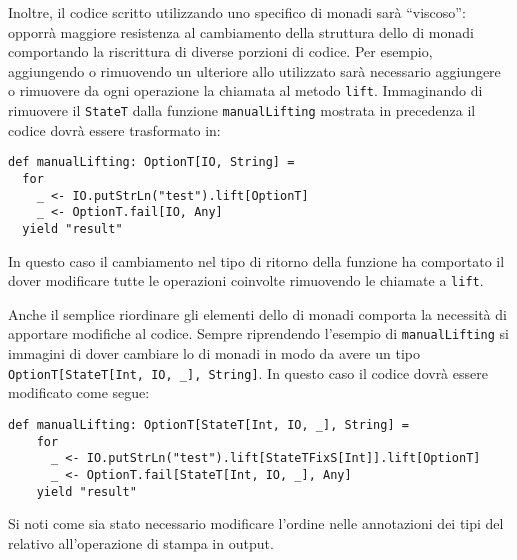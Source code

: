 Inoltre, il codice scritto utilizzando uno specifico  di monadi sarà ``viscoso'': opporrà maggiore resistenza al cambiamento della struttura dello  di monadi comportando la riscrittura di diverse porzioni di codice. Per esempio, aggiungendo o rimuovendo un ulteriore  allo  utilizzato sarà necessario aggiungere o rimuovere da ogni operazione la chiamata al metodo \lstinline{lift}. Immaginando di rimuovere il  \lstinline{StateT} dalla funzione \lstinline{manualLifting} mostrata in precedenza il codice dovrà essere trasformato in:
\begin{lstlisting}[language=scala3]
def manualLifting: OptionT[IO, String] =
  for
    _ <- IO.putStrLn("test").lift[OptionT]
    _ <- OptionT.fail[IO, Any]
  yield "result"
\end{lstlisting}
In questo caso il cambiamento nel tipo di ritorno della funzione ha comportato il dover modificare tutte le operazioni coinvolte rimuovendo le chiamate a \lstinline{lift}.

Anche il semplice riordinare gli elementi dello  di monadi comporta la necessità di apportare modifiche al codice. Sempre riprendendo l'esempio di \lstinline{manualLifting} si immagini di dover cambiare lo  di monadi in modo da avere un tipo \lstinline{OptionT[StateT[Int, IO, _], String]}. In questo caso il codice dovrà essere modificato come segue:
\begin{lstlisting}[language=scala3]
  def manualLifting: OptionT[StateT[Int, IO, _], String] =
    for
      _ <- IO.putStrLn("test").lift[StateTFixS[Int]].lift[OptionT]
      _ <- OptionT.fail[StateT[Int, IO, _], Any]
    yield "result"
\end{lstlisting}
Si noti come sia stato necessario modificare l'ordine nelle annotazioni dei tipi del  relativo all'operazione di stampa in output.

